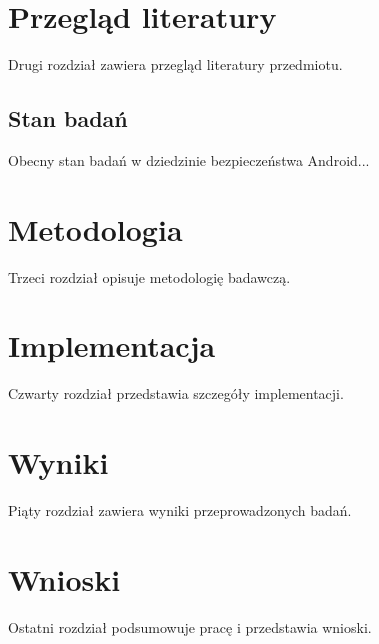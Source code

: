 \documentclass{ppfcmthesis}
\begin{document}
\chapter{Przegląd literatury}

Drugi rozdział zawiera przegląd literatury przedmiotu.

\section{Stan badań}

Obecny stan badań w dziedzinie bezpieczeństwa Android...

\chapter{Metodologia}

Trzeci rozdział opisuje metodologię badawczą.

\chapter{Implementacja}

Czwarty rozdział przedstawia szczegóły implementacji.

\chapter{Wyniki}

Piąty rozdział zawiera wyniki przeprowadzonych badań.

\chapter{Wnioski}

Ostatni rozdział podsumowuje pracę i przedstawia wnioski.
\end{document}
